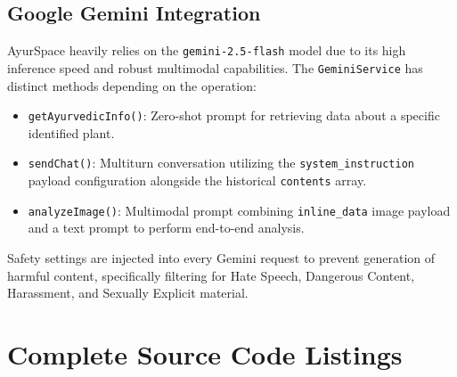 \documentclass[12pt, a4paper]{report}
\begin{document}
\subsection{Google Gemini Integration}
AyurSpace heavily relies on the \texttt{gemini-2.5-flash} model due to its high inference speed and robust multimodal capabilities. The \texttt{GeminiService} has distinct methods depending on the operation:
\begin{itemize}
    \item \texttt{getAyurvedicInfo()}: Zero-shot prompt for retrieving data about a specific identified plant.
    \item \texttt{sendChat()}: Multiturn conversation utilizing the \texttt{system\_instruction} payload configuration alongside the historical \texttt{contents} array.
    \item \texttt{analyzeImage()}: Multimodal prompt combining \texttt{inline\_data} image payload and a text prompt to perform end-to-end analysis.
\end{itemize}

Safety settings are injected into every Gemini request to prevent generation of harmful content, specifically filtering for Hate Speech, Dangerous Content, Harassment, and Sexually Explicit material.

\newpage
\section{Complete Source Code Listings}
\justify
\end{document}

